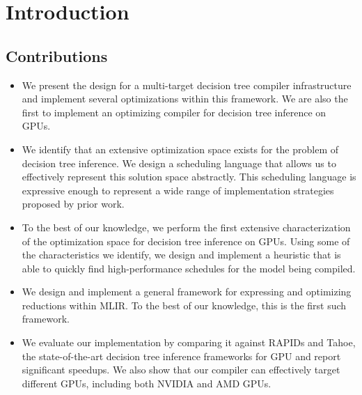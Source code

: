 \section{Introduction}
\label{sec:intro}

\subsection{Contributions}
\begin{itemize}
  \item We present the design for a multi-target decision tree compiler infrastructure and implement several optimizations within this framework.
   We are also the first to implement an optimizing compiler for decision tree inference on GPUs.
  \item We identify that an extensive optimization space exists for the problem of decision tree inference. We design a scheduling language that 
  allows us to effectively represent this solution space abstractly. This scheduling language is expressive enough to represent a wide range of  
  implementation strategies proposed by prior work.
  \item To the best of our knowledge, we perform the first extensive characterization of the optimization space for decision tree inference 
  on GPUs. Using some of the characteristics we identify, we design and implement a heuristic that is able to quickly find high-performance 
  schedules for the model being compiled. 
  \item We design and implement a general framework for expressing and optimizing reductions within MLIR. To the best of our knowledge, this is the first
  such framework.
  \item We evaluate our implementation by comparing it against RAPIDs and Tahoe, the state-of-the-art decision tree inference frameworks for GPU and 
  report significant speedups. We also show that our compiler can effectively target different GPUs, including both NVIDIA and AMD GPUs.
\end{itemize}